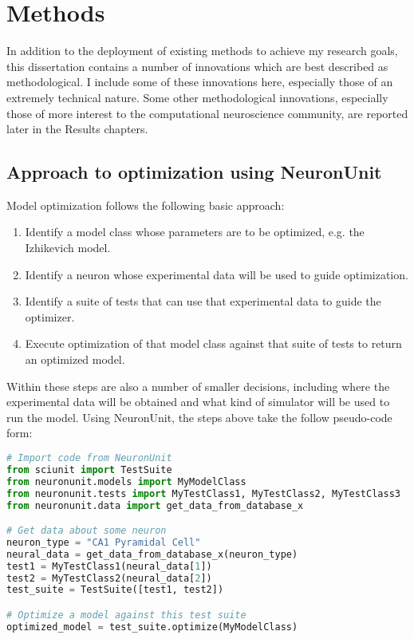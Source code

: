 \chapter{Methods}
In addition to the deployment of existing methods to achieve my research goals, this dissertation contains a number of innovations which are best described as methodological.  I include some of these innovations here, especially those of an extremely technical nature.  Some other methodological innovations, especially those of more interest to the computational neuroscience community, are reported later in the Results chapters.

\section{Approach to optimization using NeuronUnit}
Model optimization follows the following basic approach:
\begin{enumerate}
	\item Identify a model class whose parameters are to be optimized, e.g. the Izhikevich model.
	\item Identify a neuron whose experimental data will be used to guide optimization.
	\item Identify a suite of tests that can use that experimental data to guide the optimizer.
	\item Execute optimization of that model class against that suite of tests to return an optimized model.
\end{enumerate}
Within these steps are also a number of smaller decisions, including where the experimental data will be obtained and what kind of simulator will be used to run the model.
Using NeuronUnit, the steps above take the follow pseudo-code form:
\clearpage
\begin{lstlisting}[language=python]
# Import code from NeuronUnit
from sciunit import TestSuite
from neuronunit.models import MyModelClass
from neuronunit.tests import MyTestClass1, MyTestClass2, MyTestClass3
from neuronunit.data import get_data_from_database_x

# Get data about some neuron
neuron_type = "CA1 Pyramidal Cell"
neural_data = get_data_from_database_x(neuron_type)
test1 = MyTestClass1(neural_data[1])
test2 = MyTestClass2(neural_data[2])
test_suite = TestSuite([test1, test2])

# Optimize a model against this test suite
optimized_model = test_suite.optimize(MyModelClass)
\end{lstlisting}



